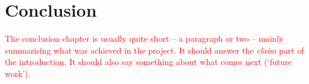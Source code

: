 \chapter{Conclusion}\label{cha:conclusion}
%

\textcolor{red}{The conclusion chapter is usually quite short – a paragraph or two – mainly summarising what was achieved in the project. It should answer the \emph{claim} part of the introduction. It should also say something about what comes next (`future work').}